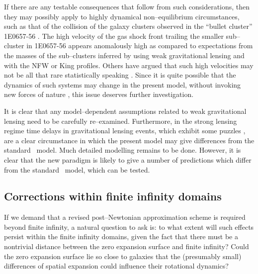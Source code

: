 \documentclass[12pt]{article}
\begin{document}
If there are any testable consequences that follow from such considerations,
then they may possibly apply to highly dynamical non--equilibrium
circumstances, such as that of the collision of the galaxy clusters observed
in the ``bullet cluster'' 1E0657-56 \cite{bullet1}. The high velocity of the
gas shock front trailing the smaller sub--cluster in 1E0657-56 appears
anomalously high \cite{bullet2} as compared to expectations from the
masses of the sub--clusters inferred by using weak gravitational lensing
and with the NFW or King \cite{King} profiles. Others have argued
that such high velocities may not be all that rare statistically
speaking \cite{Hayashi}. Since it is quite possible that the dynamics
of such systems may change in the present model, without invoking new
forces of nature \cite{bullet2}, this issue deserves further investigation.

It is clear that any model--dependent assumptions related to weak
gravitational lensing need to be carefully re--examined. Furthermore,
in the strong lensing regime time delays
in gravitational lensing events, which exhibit some puzzles
\cite{Kochanek}, are a clear circumstance in which the present model
may give differences from the standard \LCDM\ model. Much detailed
modelling remains to be done. However, it is clear that the new
paradigm is likely to give a number of predictions which differ from the
standard \LCDM\ model, which can be tested.

\subsection{Corrections within finite infinity domains\label{fid}}

If we demand that a revised post--Newtonian approximation scheme is required
beyond finite infinity, a natural question to ask is: to what extent
will such effects persist within the finite infinity domains, given the
fact that there must be a nontrivial distance between the zero expansion
surface and finite infinity? Could the zero expansion surface lie so
close to galaxies that the (presumably small) differences of spatial
expansion could influence their rotational dynamics?
\end{document}
